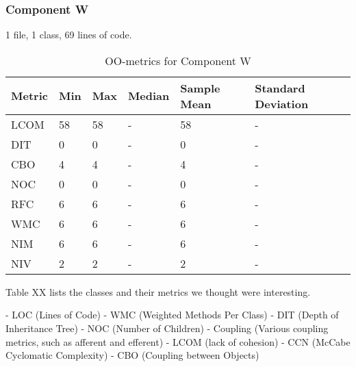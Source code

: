 \subsubsection{Component W}
1 file, 1 class, 69 lines of code.
\begin{table}[]
\centering
\caption{OO-metrics for Component W}
\label{tab:oometrics-watch}
\begin{tabular}{|l|l|l|l|l|l|}
\hline
\textbf{Metric} & \textbf{Min} & \textbf{Max} & \textbf{Median} & \textbf{Sample Mean} & \textbf{Standard Deviation} \\ \hline
LCOM            & 58           & 58           & -               & 58                   & -                           \\ \hline
DIT             & 0            & 0            & -               & 0                    & -                           \\ \hline
CBO             & 4            & 4            & -               & 4                    & -                           \\ \hline
NOC             & 0            & 0            & -               & 0                    & -                           \\ \hline
RFC             & 6            & 6            & -               & 6                    & -                           \\ \hline
WMC             & 6            & 6            & -               & 6                    & -                           \\ \hline
NIM             & 6            & 6            & -               & 6                    & -                           \\ \hline
NIV             & 2            & 2            & -               & 2                    & -                           \\ \hline
\end{tabular}
\end{table}







Table XX lists the classes and their metrics we thought were interesting. 


- LOC (Lines of Code)
- WMC (Weighted Methods Per Class)
- DIT (Depth of Inheritance Tree)
- NOC (Number of Children)
- Coupling (Various coupling metrics, such as afferent and efferent)
- LCOM (lack of cohesion)
- CCN (McCabe Cyclomatic Complexity)
- CBO (Coupling between Objects)

